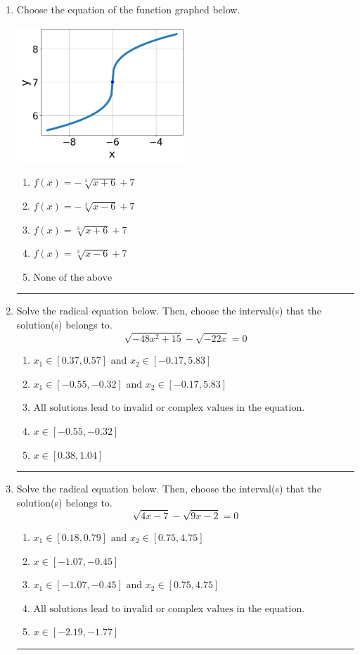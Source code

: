 \documentclass[14pt]{extbook}
\newcommand{\litem}[1]{\item#1\hspace*{-1cm}\rule{\textwidth}{0.4pt}}
\begin{document}
\begin{enumerate}
{\begin{enumerate}[label=\Alph*.]
\end{enumerate} }
\litem{
Choose the equation of the function graphed below.
\begin{center}
    \includegraphics[width=0.5\textwidth]{../Figures/radicalGraphToEquationA.png}
\end{center}
\begin{enumerate}[label=\Alph*.]
\item \( f(x) = - \sqrt[3]{x + 6} + 7 \)
\item \( f(x) = - \sqrt[3]{x - 6} + 7 \)
\item \( f(x) = \sqrt[3]{x + 6} + 7 \)
\item \( f(x) = \sqrt[3]{x - 6} + 7 \)
\item \( \text{None of the above} \)

\end{enumerate} }
\litem{
Solve the radical equation below. Then, choose the interval(s) that the solution(s) belongs to.\[ \sqrt{-48 x^2 + 15} - \sqrt{-22 x} = 0 \]\begin{enumerate}[label=\Alph*.]
\item \( x_1 \in [0.37, 0.57] \text{ and } x_2 \in [-0.17,5.83] \)
\item \( x_1 \in [-0.55, -0.32] \text{ and } x_2 \in [-0.17,5.83] \)
\item \( \text{All solutions lead to invalid or complex values in the equation.} \)
\item \( x \in [-0.55,-0.32] \)
\item \( x \in [0.38,1.04] \)

\end{enumerate} }
\litem{
Solve the radical equation below. Then, choose the interval(s) that the solution(s) belongs to.\[ \sqrt{4 x - 7} - \sqrt{9 x - 2} = 0 \]\begin{enumerate}[label=\Alph*.]
\item \( x_1 \in [0.18, 0.79] \text{ and } x_2 \in [0.75,4.75] \)
\item \( x \in [-1.07,-0.45] \)
\item \( x_1 \in [-1.07, -0.45] \text{ and } x_2 \in [0.75,4.75] \)
\item \( \text{All solutions lead to invalid or complex values in the equation.} \)
\item \( x \in [-2.19,-1.77] \)


\end{enumerate}}
\end{enumerate}
\end{document}
